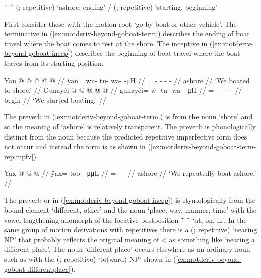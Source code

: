\documentclass[12pt,letterpaper,oneside,article]{memoir}
\begin{document}
\pex\label{ex:motderiv-beyond-two}%
\a\label{ex:motderiv-beyond-two-term}%
%
	 \~\  \~\  (;  repetitive) ‘ashore, ending’
\a\label{ex:motderiv-beyond-two-incep}%
%
	/ (;  repetitive) ‘starting, beginning’
\xe

First consider these with the motion root  ‘go by boat or other vehicle’.
The terminative in (\ref{ex:motderiv-beyond-goboat-term}) describes the ending of boat travel where the boat comes to rest at the shore.
The inceptive in (\ref{ex:motderiv-beyond-goboat-incep}) describes the beginning of boat travel where the boat leaves from its starting position.

\pex\label{ex:motderiv-beyond-goboat}%
\a\label{ex:motderiv-beyond-goboat-term}%
\begingl
	\gla	Yan @  @ {} @ {} @ {} @ {} //
	\glb	ÿan= wu- tu- wa-  -μH //
	\glc	{}= - - -  - //
	\gld	ashore\·  {} {} {} {} //
	\glft	‘We boated to shore.’
		//
\endgl
\a\label{ex:motderiv-beyond-goboat-incep}%
\begingl
	\gla	G̱unayéi @  @ {} @ {} @ {} @ {} //
	\glb	g̱unayéi= w- tu- wa-  -μH //
	\glc	{}= - - -  - //
	\gld	begin\·  {} {} {} {} //
	\glft	‘We started boating.’
		//
\endgl
\xe

The preverb  in (\ref{ex:motderiv-beyond-goboat-term}) is from the noun  ‘shore’ and so the meaning of ‘ashore’ is relatively transparent.
The preverb is phonologically distinct from the noun because the predicted repetitive imperfective form  does not occur and instead the form is  as shown in (\ref{ex:motderiv-beyond-goboat-term-repimpfv}).

\ex\label{ex:motderiv-beyond-goboat-term-repimpfv}%
\begingl
	\gla	Yax̱ @  @ {} @ {} //
	\glb	ÿax̱= too-  -μμL //
	\glc	{}= -  - //
	\gld	ashore\·  {} {} //
	\glft	‘We repeatedly boat ashore.’
		//
\endgl
\xe

The preverb  or  in (\ref{ex:motderiv-beyond-goboat-incep}) is etymologically from the bound element  ‘different, other’ and the noun  ‘place; way, manner; time’ with the vowel lengthening allomorph  of the locative postposition  \~\  \~\  ‘at, on, in’.
In the same group of motion derivations with  repetitives there is a  (;  repetitive) ‘nearing NP’ that probably reflects the original meaning of  <  as something like ‘nearing a different place’.
The noun  ‘different place’ occurs elsewhere as an ordinary noun such as with the  (;  repetitive) ‘to(ward) NP’ shown in (\ref{ex:motderiv-beyond-goboat-differentplace}).
\end{document}
